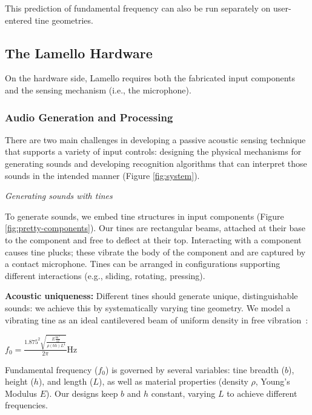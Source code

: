     This prediction of fundamental frequency can also be run separately on user-entered tine geometries.

    \subsection{The Lamello Hardware}
    
    On the hardware side, Lamello requires both the fabricated input components and the sensing mechanism (i.e., the microphone).
    
    \subsubsection{Audio Generation and Processing}

There are two main challenges in developing a passive acoustic sensing technique that supports a variety of input controls: designing the physical mechanisms for generating sounds and developing recognition algorithms that can interpret those sounds in the intended manner (Figure \ref{fig:system}). 

\emph{Generating sounds with tines}

To generate sounds, we embed tine structures in input components (Figure \ref{fig:pretty-components}). Our tines are rectangular beams, attached at their base to the component and free to deflect at their top. Interacting with a component causes tine plucks; these vibrate the body of the component and are captured by a contact microphone.
Tines can be arranged in configurations supporting different interactions (e.g., sliding, rotating, pressing).


\textbf{Acoustic uniqueness:} Different tines should generate unique, distinguishable sounds: we achieve this by systematically varying tine geometry. We model a vibrating tine as an ideal cantilevered beam of uniform density in free vibration~\cite{Meirovitch-analytical}: 

\begin{center}
 $f_0 = \frac{1.875^2 \sqrt{\frac{E\frac{bh^3}{12}}{\rho (bh)L^4}}}{2\pi}$Hz
\end{center}

Fundamental frequency ($f_0$) is governed by several variables: tine breadth ($b$), height ($h$), and length ($L$), as well as material properties (density $\rho$, Young's Modulus $E$). Our designs keep $b$ and $h$ constant, varying $L$ to achieve different frequencies.

